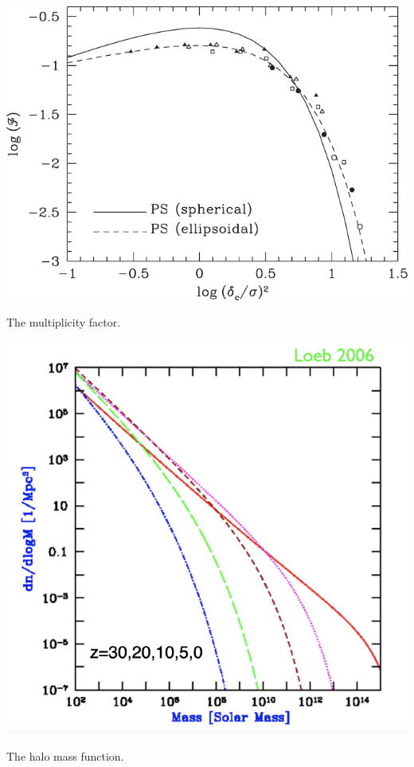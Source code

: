 \begin{marginfigure}
	\includegraphics[width=\textwidth]{img/ch-04/PS.pdf}
	\caption{The multiplicity factor.}
	\label{fig:multiplicity}
\end{marginfigure}
\begin{marginfigure}
	\includegraphics[width=\textwidth]{img/ch-04/dndm.pdf}
	\caption{The halo mass function.}
	\label{fig:dndm}
\end{marginfigure}



